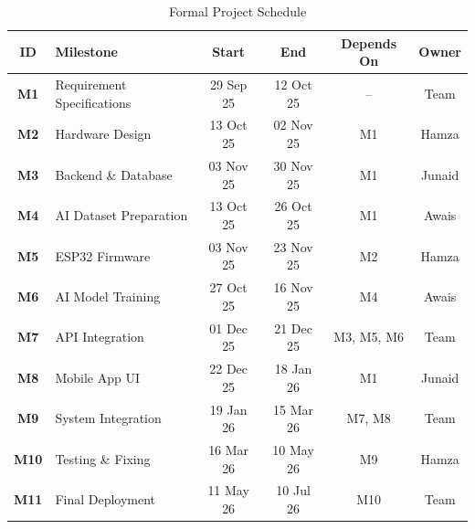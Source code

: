 \enlargethispage{5cm}
\begin{table}[H]
    \centering
    \caption{Formal Project Schedule}
    \label{tab:project_schedule}
    \vspace{0.2cm}
    \renewcommand{\arraystretch}{1.4}
    \begin{tabularx}{\textwidth}{|c|X|c|c|c|c|}
        \hline
        \rowcolor{black}
        \color{white}\textbf{ID} & \color{white}\textbf{Milestone} & \color{white}\textbf{Start} & \color{white}\textbf{End} & \color{white}\textbf{Depends On} & \color{white}\textbf{Owner} \\ \hline
        \textbf{M1}  & Requirement Specifications & 29 Sep 25 & 12 Oct 25 & -- & Team \\ \hline
        \textbf{M2}  & Hardware Design & 13 Oct 25 & 02 Nov 25 & M1 & Hamza \\ \hline
        \textbf{M3}  & Backend \& Database & 03 Nov 25 & 30 Nov 25 & M1 & Junaid \\ \hline
        \textbf{M4}  & AI Dataset Preparation & 13 Oct 25 & 26 Oct 25 & M1 & Awais \\ \hline
        \textbf{M5}  & ESP32 Firmware & 03 Nov 25 & 23 Nov 25 & M2 & Hamza \\ \hline
        \textbf{M6}  & AI Model Training & 27 Oct 25 & 16 Nov 25 & M4 & Awais \\ \hline
        \textbf{M7}  & API Integration & 01 Dec 25 & 21 Dec 25 & M3, M5, M6 & Team \\ \hline
        \textbf{M8}  & Mobile App UI & 22 Dec 25 & 18 Jan 26 & M1 & Junaid \\ \hline
        \textbf{M9}  & System Integration & 19 Jan 26 & 15 Mar 26 & M7, M8 & Team \\ \hline
        \textbf{M10} & Testing \& Fixing & 16 Mar 26 & 10 May 26 & M9 & Hamza \\ \hline
        \textbf{M11} & Final Deployment & 11 May 26 & 10 Jul 26 & M10 & Team \\ \hline
    \end{tabularx}
\end{table}

\setcounter{chapter}{1}